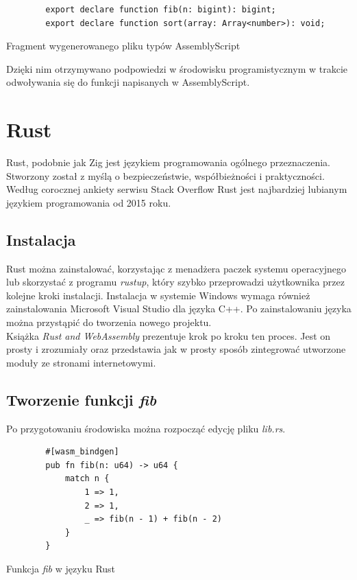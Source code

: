\documentclass[language=polish,type=master]{aghmodern}
\begin{document}
\begin{listing}[H]
    \begin{verbatim}
        export declare function fib(n: bigint): bigint;
        export declare function sort(array: Array<number>): void;
    \end{verbatim}
    \caption{Fragment wygenerowanego pliku typów AssemblyScript}
\end{listing}

Dzięki nim otrzymywano podpowiedzi w środowisku programistycznym w trakcie odwoływania się do funkcji napisanych w AssemblyScript.

\section{Rust}
Rust, podobnie jak Zig jest językiem programowania ogólnego przeznaczenia.
Stworzony został z myślą o bezpieczeństwie, współbieżności i praktyczności.
Według corocznej ankiety serwisu Stack Overflow\footnotemark{} Rust jest najbardziej lubianym językiem programowania od 2015 roku.

\subsection{Instalacja}
Rust można zainstalować, korzystając z menadżera paczek systemu operacyjnego lub skorzystać z programu \emph{rustup}\footnotemark{}, który szybko przeprowadzi użytkownika przez kolejne kroki instalacji.
Instalacja w systemie Windows wymaga również zainstalowania Microsoft Visual Studio dla języka C++.
Po zainstalowaniu języka można przystąpić do tworzenia nowego projektu. \\
Książka \emph{Rust and WebAssembly}\footnotemark{} prezentuje krok po kroku ten proces.
Jest on prosty i zrozumiały oraz przedstawia jak w prosty sposób zintegrować utworzone moduły ze stronami internetowymi.

\subsection{Tworzenie funkcji \emph{fib}}
Po przygotowaniu środowiska można rozpocząć edycję pliku \emph{lib.rs}.

\begin{listing}[H]
    \begin{verbatim}
        #[wasm_bindgen]
        pub fn fib(n: u64) -> u64 {
            match n {
                1 => 1,
                2 => 1,
                _ => fib(n - 1) + fib(n - 2)
            }
        }
    \end{verbatim}
    \caption{Funkcja \emph{fib} w języku Rust}
\end{listing}
\end{document}
